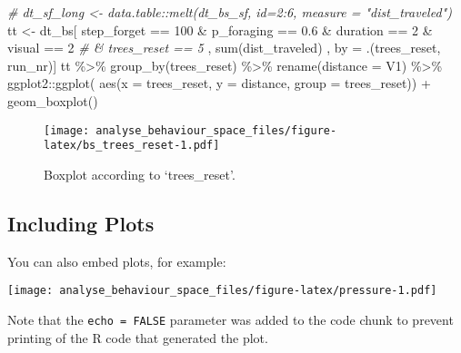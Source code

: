 \documentclass[
]{article}
\newenvironment{Shaded}{\begin{snugshade}}{\end{snugshade}}
\newcommand{\AttributeTok}[1]{\textcolor[rgb]{0.77,0.63,0.00}{#1}}
\newcommand{\CommentTok}[1]{\textcolor[rgb]{0.56,0.35,0.01}{\textit{#1}}}
\newcommand{\DecValTok}[1]{\textcolor[rgb]{0.00,0.00,0.81}{#1}}
\newcommand{\FloatTok}[1]{\textcolor[rgb]{0.00,0.00,0.81}{#1}}
\newcommand{\FunctionTok}[1]{\textcolor[rgb]{0.00,0.00,0.00}{#1}}
\newcommand{\NormalTok}[1]{#1}
\newcommand{\OtherTok}[1]{\textcolor[rgb]{0.56,0.35,0.01}{#1}}
\newcommand{\SpecialCharTok}[1]{\textcolor[rgb]{0.00,0.00,0.00}{#1}}
\begin{document}
\begin{Shaded}
\begin{Highlighting}[]
\CommentTok{\# dt\_sf\_long \textless{}{-} data.table::melt(dt\_bs\_sf, id=2:6, measure = "dist\_traveled")}
\NormalTok{tt }\OtherTok{\textless{}{-}}\NormalTok{ dt\_bs[ step\_forget }\SpecialCharTok{==} \DecValTok{100}
    \SpecialCharTok{\&}\NormalTok{ p\_foraging }\SpecialCharTok{==} \FloatTok{0.6}
    \SpecialCharTok{\&}\NormalTok{ duration }\SpecialCharTok{==} \DecValTok{2}
    \SpecialCharTok{\&}\NormalTok{ visual }\SpecialCharTok{==} \DecValTok{2}
\CommentTok{\#    \& trees\_reset == 5}
\NormalTok{    , }\FunctionTok{sum}\NormalTok{(dist\_traveled) , by }\OtherTok{=}\NormalTok{ .(trees\_reset, run\_nr)]}
\NormalTok{tt }\SpecialCharTok{\%\textgreater{}\%} \FunctionTok{group\_by}\NormalTok{(trees\_reset) }\SpecialCharTok{\%\textgreater{}\%} \FunctionTok{rename}\NormalTok{(}\AttributeTok{distance =}\NormalTok{ V1) }\SpecialCharTok{\%\textgreater{}\%} 
\NormalTok{ggplot2}\SpecialCharTok{::}\FunctionTok{ggplot}\NormalTok{( }\FunctionTok{aes}\NormalTok{(}\AttributeTok{x =}\NormalTok{ trees\_reset, }\AttributeTok{y =}\NormalTok{ distance, }\AttributeTok{group =}\NormalTok{ trees\_reset)) }\SpecialCharTok{+} \FunctionTok{geom\_boxplot}\NormalTok{()}
\end{Highlighting}
\end{Shaded}

\begin{figure}
\centering
\texttt{[image: analyse\_behaviour\_space\_files/figure-latex/bs\_trees\_reset-1.pdf]}
\caption{Boxplot according to `trees\_reset'.}
\end{figure}

\hypertarget{including-plots}{%
\subsection{Including Plots}\label{including-plots}}

You can also embed plots, for example:

\texttt{[image: analyse\_behaviour\_space\_files/figure-latex/pressure-1.pdf]}

Note that the \texttt{echo\ =\ FALSE} parameter was added to the code
chunk to prevent printing of the R code that generated the plot.
\end{document}
